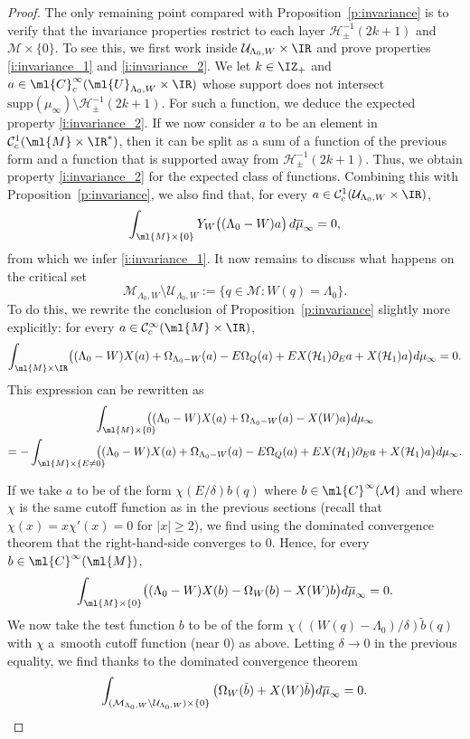 \documentclass[10pt]{amsart}
\theoremstyle{plain}
\theoremstyle{definition}
\theoremstyle{remark}
\begin{document}
\begin{proof}
The only remaining point compared with Proposition~\ref{p:invariance} is to verify that the invariance properties restrict to each layer $\mathcal{H}_\pm^{-1}(2k+1) $ and $\mathcal{M}\times\{0\}.$ To see this, we first work inside $\mathcal{U}_{\Lambda_0,W}\times\IR$ and prove properties \eqref{i:invariance_1} and \eqref{i:invariance_2}. We let $k\in\IZ_+$ and $a\in\ml{C}^{\infty}_{c}(\ml{U}_{\Lambda_0,W}\times\IR)$ whose support does not intersect $\text{supp}(\mu_\infty)\setminus\mathcal{H}_\pm^{-1}(2k+1)$. For such a function, we deduce the expected property \eqref{i:invariance_2}. If we now consider $a$ to be an element in $\mathcal{C}^1_c(\ml{M}\times\IR^*)$, then it can be split as a sum of a function of the previous form and a function that is supported away from $\mathcal{H}_\pm^{-1}(2k+1)$. Thus, we obtain property \eqref{i:invariance_2} for the expected class of functions. Combining this with Proposition~\ref{p:invariance}, we also find that, for every $a\in\mathcal{C}^1_c(\mathcal{U}_{\Lambda_0,W}\times\IR)$,
\[
\int_{\ml{M}\times\{0\}} Y_W \big((\Lambda_0-W)a \big) \, d\overline{ \mu}_\infty = 0,
\]
from which we infer \eqref{i:invariance_1}. It now remains to discuss what happens on the critical set
\[
\mathcal{M}_{\Lambda_0,W}\setminus\mathcal{U}_{\Lambda_0,W}:=\{q\in\mathcal{M}: W(q)=\Lambda_0\}.
\]
To do this, we rewrite the conclusion of Proposition~\ref{p:invariance} slightly more explicitly: for every $a\in\mathcal{C}^{\infty}_c(\ml{M}\times\IR)$,
\[
\int_{\ml{M}\times\IR}\bigl((\Lambda_0-W)X(a)+\Omega_{\Lambda_0-W}(a)-E\Omega_Q(a)+EX(\mathcal{H}_1)\partial_Ea+X(\mathcal{H}_1)a\bigr)d\mu_{\infty}=0.
\]
This expression can be rewritten as
\begin{multline*}
\int_{\ml{M}\times\{0\}}\hspace*{-3mm}\bigl((\Lambda_0-W)X(a)+\Omega_{\Lambda_0-W}(a)-X(W)a\bigr)d\mu_{\infty}\\
=-\int_{\ml{M}\times\{E\neq 0\}}\hspace*{-3mm}\bigl((\Lambda_0-W)X(a)+\Omega_{\Lambda_0-W}(a)-E\Omega_Q(a)+EX(\mathcal{H}_1)\partial_Ea+X(\mathcal{H}_1)a\bigr)d\mu_{\infty}.
\end{multline*}

If we take $a$ to be of the form $\chi(E/\delta)b(q)$ where $b\in\ml{C}^{\infty}(\mathcal{M})$ and where $\chi$ is the same cutoff function as in the previous sections (recall that $\chi(x)=x\chi'(x)=0$ for $|x|\geq 2$), we find using the dominated convergence theorem that the right-hand-side converges to $0$. Hence, for every $b\in\ml{C}^{\infty}(\ml{M})$,
\[
\int_{\ml{M}\times\{0\}}\bigl((\Lambda_0-W)X(b)-\Omega_{W}(b)-X(W)b\bigr)d\overline{\mu}_{\infty}=0.
\]
We now take the test function $b$ to be of the form $\chi((W(q)-\Lambda_0)/\delta)\tilde{b}(q)$ with $\chi$ a~smooth cutoff function (near $0$) as above. Letting $\delta\to 0$ in the previous equality, we find thanks to the dominated convergence theorem
\[
\int_{(\mathcal{M}_{\Lambda_0,W}\setminus\mathcal{U}_{\Lambda_0,W})\times\{0\}}\big(\Omega_{W}(\tilde{b})+X(W)\tilde{b}\big)d\overline{\mu}_{\infty}=0.\qedhere
\]
\end{proof}
\end{document}

